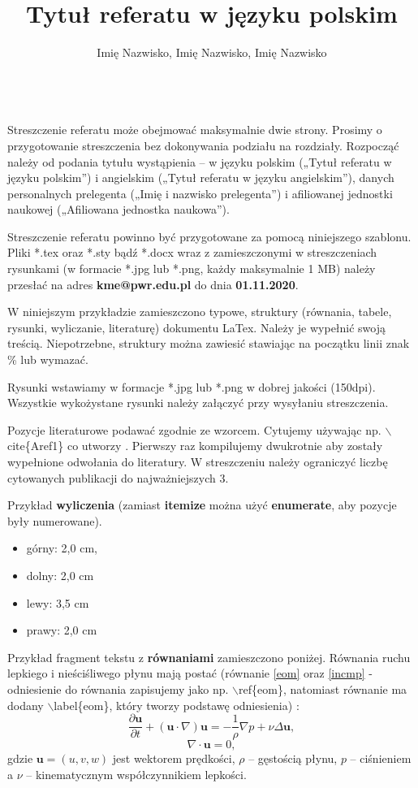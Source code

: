 \documentclass[polish,a4paper]{article}
\title{Tytuł referatu w języku polskim}
\author{
Imię Nazwisko\affmark[1], Imię Nazwisko\affmark[1], Imię Nazwisko\affmark[2]\\
\affaddr{\affmark[1] Afiliacja autorów 1 oraz 2}\\
\affaddr{\affmark[2] Afiliacja autora 3}
}
\begin{document}
\maketitle

Streszczenie referatu może obejmować maksymalnie dwie strony. Prosimy o przygotowanie streszczenia bez dokonywania podziału na rozdziały. Rozpocząć należy od podania tytułu wystąpienia – w języku polskim („Tytuł referatu w języku polskim”) i angielskim („Tytuł referatu w języku angielskim”), danych personalnych prelegenta („Imię i nazwisko prelegenta”) i afiliowanej jednostki naukowej („Afiliowana jednostka naukowa”).

Streszczenie referatu powinno być przygotowane za pomocą niniejszego szablonu. Pliki  *.tex oraz *.sty bądź *.docx wraz z zamieszczonymi w streszczeniach rysunkami (w formacie *.jpg lub *.png, każdy maksymalnie 1 MB) należy przesłać na adres \textbf{kme@pwr.edu.pl} do dnia \textbf{01.11.2020}.

W niniejszym przykładzie zamieszczono typowe, struktury (równania, tabele, rysunki, wyliczanie, literaturę) dokumentu LaTex. Należy je wypełnić swoją treścią.  Niepotrzebne, struktury można zawiesić stawiając na początku linii znak \% lub wymazać.

Rysunki wstawiamy w formacje *.jpg lub *.png w dobrej jakości (150dpi). Wszystkie wykożystane rysunki należy załączyć przy wysyłaniu streszczenia.

Pozycje literaturowe  podawać zgodnie ze wzorcem. Cytujemy używając np. $\backslash$cite\{Aref1\}  co utworzy \cite{Aref1}. Pierwszy raz kompilujemy dwukrotnie aby zostały wypełnione odwołania do literatury. W streszczeniu należy ograniczyć  liczbę cytowanych publikacji do najważniejszych 3.

Przykład \textbf{wyliczenia} (zamiast \textbf{itemize } można użyć \textbf{enumerate}, aby pozycje były numerowane).
\begin{itemize}
\item górny: 2,0 cm,
\item dolny: 2,0 cm
\item lewy:  3,5 cm
\item prawy: 2,0 cm
\end{itemize}

Przykład fragment tekstu z \textbf{równaniami} zamieszczono poniżej.
Równania ruchu lepkiego i nieściśliwego płynu mają postać (równanie \ref{eom} oraz \ref{incmp} - odniesienie do równania zapisujemy jako np. $\backslash$ref\{eom\}, natomiast równanie ma dodany $\backslash$label\{eom\}, który tworzy podstawę odniesienia) \cite{Kochin, Aref1}:
\begin{equation}\label{eom}
\frac{\partial{\mathbf{u}}}{\partial t}+(\mathbf{u} \cdot \nabla)\mathbf{u}=-\frac{1}{\rho}\nabla p+\nu \Delta \mathbf{u},
\end{equation}
\begin{equation}\label{incmp}
\nabla \cdot \mathbf{u}=0,
\end{equation}
gdzie $\mathbf{u}=(u,v,w)$ jest wektorem prędkości, $\rho$ -- gęstością płynu, $p$ -- ciśnieniem a $\nu$ -- kinematycznym współczynnikiem lepkości.
\end{document}
